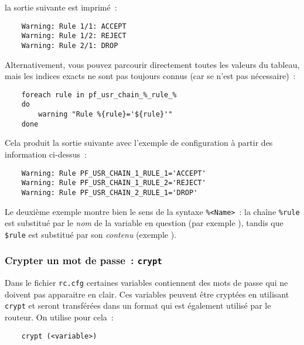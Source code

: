     la sortie suivante est imprimé~:

\begin{example}
\begin{verbatim}
    Warning: Rule 1/1: ACCEPT
    Warning: Rule 1/2: REJECT
    Warning: Rule 2/1: DROP
\end{verbatim}
\end{example}

    Alternativement, vous pouvez parcourir directement toutes les valeurs du tableau,
	mais les indices exacts ne sont pas toujours connus (car se n'est pas nécessaire)~:

\begin{example}
\begin{verbatim}
    foreach rule in pf_usr_chain_%_rule_%
    do
        warning "Rule %{rule}='${rule}'"
    done
\end{verbatim}
\end{example}

    Cela produit la sortie suivante avec l'exemple de configuration à partir des information
	ci-dessus~:

\begin{example}
\begin{verbatim}
    Warning: Rule PF_USR_CHAIN_1_RULE_1='ACCEPT'
    Warning: Rule PF_USR_CHAIN_1_RULE_2='REJECT'
    Warning: Rule PF_USR_CHAIN_2_RULE_1='DROP'
\end{verbatim}
\end{example}

    Le deuxième exemple montre bien le sens de la syntaxe \texttt{\%{<Name>}}~:
	la chaîne \texttt{\%{rule}} est substitué par le \emph{nom} de la variable en
	question (par exemple ), tandis que \texttt{\${rule}}
	est substitué par son \emph{contenu} (exemple ).


\subsubsection{Crypter un mot de passe~: \texttt{crypt}}

Dans le fichier \texttt{rc.cfg} certaines variables contiennent des mots de passe qui
ne doivent pas apparaitre en clair. Ces variables peuvent être cryptées en
utilisant \texttt{crypt} et seront transférées dans un format qui est également utilisé
par le routeur. On utilise pour cela~:

\begin{example}
\begin{verbatim}
    crypt (<variable>)
\end{verbatim}
\end{example}

